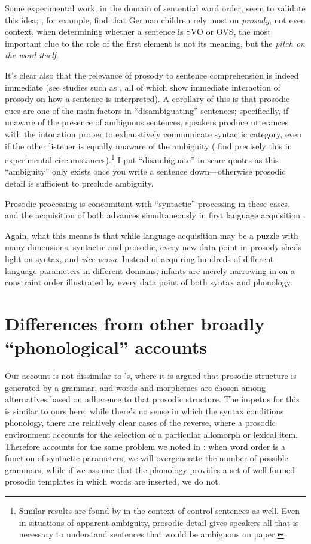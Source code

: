 \documentclass{article}
\begin{document}
Some experimental work, in the domain of sentential word order, seem to validate this idea; \textcite{grunloh11}, for example, find that German children rely most on \emph{prosody}, not even context, when determining whether a sentence is SVO or OVS, the most important clue to the role of the first element is not its meaning, but the \emph{pitch on the word itself}.

It's clear also that the relevance of prosody to sentence comprehension is indeed immediate (see studies such as \textcite{eckstein06,kerkhofs07,sammler10}, all of which show immediate interaction of prosody on how a sentence is interpreted).
A corollary of this is that prosodic cues are one of the main factors in ``disambiguating'' sentences; specifically, if unaware of the presence of ambiguous sentences, speakers produce utterances with the intonation proper to exhaustively communicate syntactic category, even if the other listener is equally unaware of the ambiguity (\textcite{millotte07} find precisely this in experimental circumstances).\footnote{Similar results are found by \textcite{bogels09} in the context of control sentences as well. Even in situations of apparent ambiguity, prosodic detail gives speakers all that is necessary to understand sentences that would be ambiguous on paper.}
I put ``disambiguate'' in scare quotes as this ``ambiguity'' only exists once you write a sentence down---otherwise prosodic detail is sufficient to preclude ambiguity.

Prosodic processing is concomitant with ``syntactic'' processing in these cases, and the acquisition of both advances simultaneously in first language acquisition \parencite{mannel11}.

Again, what this means is that while language acquisition may be a puzzle with many dimensions, syntactic and prosodic, every new data point in prosody sheds light on syntax, and \textit{vice versa}.
Instead of acquiring hundreds of different language parameters in different domains, infants are merely narrowing in on a constraint order illustrated by every data point of both syntax and phonology.

\section{Differences from other broadly ``phonological'' accounts}

Our account is not dissimilar to \textcite{hammond11}'s, where it is argued that prosodic structure is generated by a grammar, and words and morphemes are chosen among alternatives based on adherence to that prosodic structure.
The impetus for this is similar to ours here: while there's no sense in which the syntax conditions phonology, there are relatively clear cases of the reverse, where a prosodic environment accounts for the selection of a particular allomorph or lexical item.
Therefore \textcite{hammond11} accounts for the same problem we noted in \textcite{halle87}: when word order is a function of syntactic parameters, we will overgenerate the number of possible grammars, while if we assume that the phonology provides a set of well-formed prosodic templates in which words are inserted, we do not.
\end{document}
